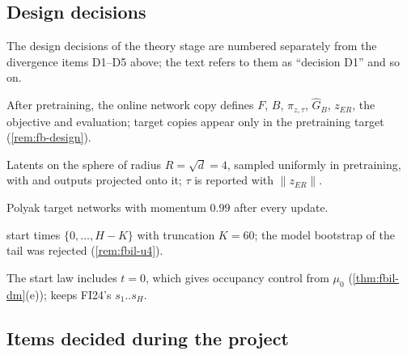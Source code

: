 \subsection{Design decisions}

The design decisions of the theory stage are numbered separately from the divergence items D1--D5 above; the text refers to them as ``decision D1'' and so on.
\begin{description}[style=nextline,leftmargin=1.2cm,font=\normalfont\sffamily]
\item[decision D1] After pretraining, the online network copy defines $F$, $B$, $\pi_{z,\tau}$, $\hat G_B$, $z_{ER}$, the \DMFB{} objective and evaluation; target copies appear only in the pretraining target (\cref{rem:fb-design}).
\item[decision D2] Latents on the sphere of radius $R=\sqrt d=4$, sampled uniformly in pretraining, with \ERFB{} and \DMFB{} outputs projected onto it; $\tau$ is reported with $\lVert z_{ER}\rVert$.
\item[decision D3] Polyak target networks with momentum $0.99$ after every update.
\item[decision D4] \DMFB{} start times $\{0,\dots,H-K\}$ with truncation $K=60$; the model bootstrap of the tail was rejected (\cref{rem:fbil-u4}).
\item[decision D5] The \DMFB{} start law includes $t=0$, which gives occupancy control from $\mu_0$ (\cref{thm:fbil-dm}(e)); \ERFB{} keeps FI24's $s_1..s_H$.
\end{description}

\subsection{Items decided during the project}

